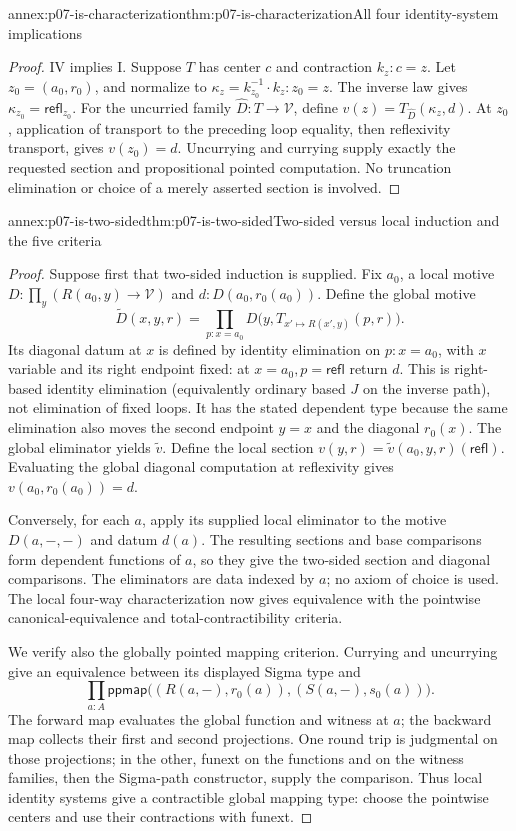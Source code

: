 \begin{annexitem}{annex:p07-is-characterization}{thm:p07-is-characterization}{All four identity-system implications}
\begin{proof}
IV implies I. Suppose \(T\) has center \(c\) and contraction
\(k_z:c=z\). Let \(z_0=(a_0,r_0)\), and normalize to
\(\kappa_z=k_{z_0}^{-1}\cdot k_z:z_0=z\).
The inverse law gives
\(\kappa_{z_0}=\mathsf{refl}_{z_0}\).
For the uncurried family \(\widehat D:T\to\mathcal V\), define
\(v(z)=T_{\widehat D}(\kappa_z,d)\).
At \(z_0\), application of transport to the preceding loop equality,
then reflexivity transport, gives \(v(z_0)=d\).
Uncurrying and currying supply exactly the requested section and
propositional pointed computation. No truncation elimination or
choice of a merely asserted section is involved.
\end{proof}
\end{annexitem}

\begin{annexitem}{annex:p07-is-two-sided}{thm:p07-is-two-sided}{Two-sided versus local induction and the five criteria}
\begin{proof}
Suppose first that two-sided induction is supplied. Fix \(a_0\),
a local motive \(D:\prod_y(R(a_0,y)\to\mathcal V)\) and
\(d:D(a_0,r_0(a_0))\). Define the global motive
\[
\widetilde D(x,y,r)=
 \prod_{p:x=a_0}
 D\bigl(y,T_{x'\mapsto R(x',y)}(p,r)\bigr).
\]
Its diagonal datum at \(x\) is defined by identity elimination on
\(p:x=a_0\), with \(x\) variable and its right endpoint fixed:
at \(x=a_0,p=\mathsf{refl}\) return \(d\).
This is right-based identity elimination (equivalently ordinary
based \(J\) on the inverse path), not elimination of fixed loops.
It has the stated dependent type because the same elimination
also moves the second endpoint \(y=x\) and the diagonal \(r_0(x)\).
The global eliminator yields \(\widetilde v\).
Define the local section
\(v(y,r)=\widetilde v(a_0,y,r)(\mathsf{refl})\).
Evaluating the global diagonal computation at reflexivity gives
\(v(a_0,r_0(a_0))=d\).

Conversely, for each \(a\), apply its supplied local eliminator to
the motive \(D(a,-,-)\) and datum \(d(a)\).
The resulting sections and base comparisons form dependent functions
of \(a\), so they give the two-sided section and diagonal comparisons.
The eliminators are data indexed by \(a\); no axiom of choice is
used. The local four-way characterization now gives equivalence
with the pointwise canonical-equivalence and total-contractibility
criteria.

We verify also the globally pointed mapping criterion. Currying and
uncurrying give an equivalence between its displayed Sigma type and
\[
\prod_{a:A}
 \mathsf{ppmap}\bigl((R(a,-),r_0(a)),(S(a,-),s_0(a))\bigr).
\]
The forward map evaluates the global function and witness at \(a\);
the backward map collects their first and second projections.
One round trip is judgmental on those projections; in the other,
funext on the functions and on the witness families, then the
Sigma-path constructor, supply the comparison. Thus local identity
systems give a contractible global mapping type: choose the
pointwise centers and use their contractions with funext.


\end{proof}
\end{annexitem}
